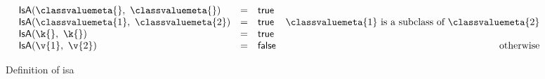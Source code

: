 \begin{figure*}
$$
\begin{array}{lclr}
  \isaopsem{\classvaluemeta{}}{\classvaluemeta{}} &=& {\true{}}\\
  \isaopsem{\classvaluemeta{1}}{\classvaluemeta{2}} &=& {\true{}} & \classvaluemeta{1}\ \text{is a subclass of}\ \classvaluemeta{2}\\
  \isaopsem{\k{}}{\k{}} &=& {\true{}}\\
  \isaopsem{\v{1}}{\v{2}} &=& {\false{}} & \text{otherwise}
\end{array}
$$
\caption{Definition of isa}
\end{figure*}
